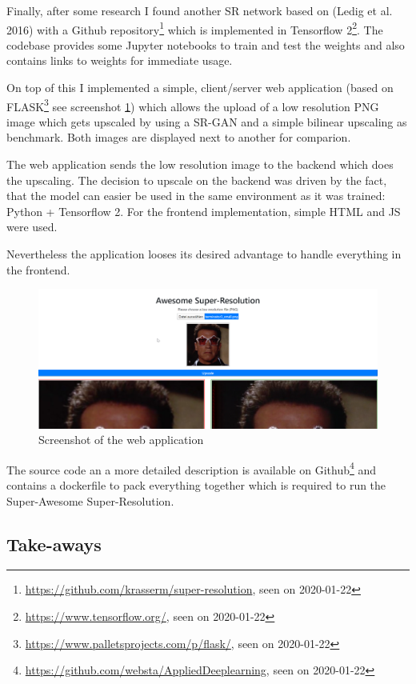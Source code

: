 \documentclass[]{article}
\let\rmarkdownfootnote\footnote%
\def\footnote{\protect\rmarkdownfootnote}
\begin{document}
Finally, after some research I found another SR network based on (Ledig
et al. 2016) with a Github
repository\footnote{\url{https://github.com/krasserm/super-resolution}, seen on 2020-01-22}
which is implemented in Tensorflow
2\footnote{\url{https://www.tensorflow.org/}, seen on 2020-01-22}. The
codebase provides some Jupyter notebooks to train and test the weights
and also contains links to weights for immediate usage.

On top of this I implemented a simple, client/server web application
(based on
FLASK\footnote{\url{https://www.palletsprojects.com/p/flask/}, seen on 2020-01-22}
see screenshot \ref{screenshot}) which allows the upload of a low
resolution PNG image which gets upscaled by using a SR-GAN and a simple
bilinear upscaling as benchmark. Both images are displayed next to
another for comparion.

The web application sends the low resolution image to the backend which
does the upscaling. The decision to upscale on the backend was driven by
the fact, that the model can easier be used in the same environment as
it was trained: Python + Tensorflow 2. For the frontend implementation,
simple HTML and JS were used.

Nevertheless the application looses its desired advantage to handle
everything in the frontend.

\begin{figure}
\centering
\includegraphics{screenshot.png}
\caption{Screenshot of the web application\label{screenshot}}
\end{figure}

The source code an a more detailed description is available on
Github\footnote{\url{https://github.com/websta/AppliedDeeplearning}, seen on 2020-01-22}
and contains a dockerfile to pack everything together which is required
to run the Super-Awesome Super-Resolution.

\hypertarget{take-aways}{%
\subsection{Take-aways}\label{take-aways}}
\end{document}
